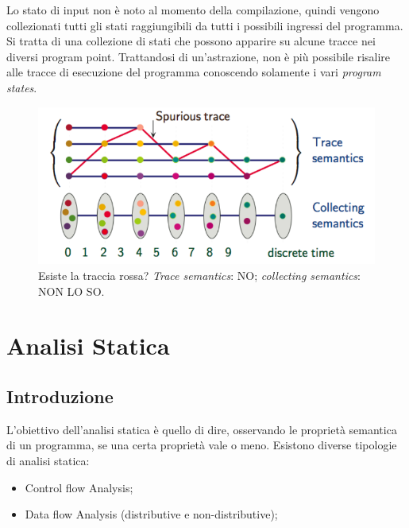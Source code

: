 \documentclass{article}
\begin{document}
            Lo stato di input non è noto al momento della compilazione, quindi vengono collezionati tutti gli stati raggiungibili da tutti i possibili ingressi del programma.\\
            Si tratta di una collezione di stati che possono apparire su alcune tracce nei diversi program point. Trattandosi di un'astrazione, non è più possibile risalire alle tracce di esecuzione del programma conoscendo solamente i vari \textit{program states}.
            \begin{figure}[H]
                \centering
                \includegraphics[scale=0.32]{TraceCollect}
                \caption{Esiste la traccia rossa? \textit{Trace semantics}: NO; \textit{collecting semantics}: NON LO SO.}
            \end{figure}

    \newpage
    \section{Analisi Statica}
        \subsection{Introduzione}
            L'obiettivo dell'analisi statica è quello di dire, osservando le proprietà semantica di un programma, se una certa proprietà vale o meno. Esistono diverse tipologie di analisi statica: \begin{itemize}
                \item Control flow Analysis;
                \item Data flow Analysis (distributive e non-distributive);
            \end{itemize}
\end{document}
